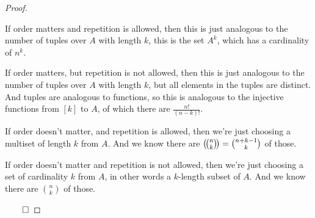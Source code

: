\begin{proof}

	\begin{msecitemize}
		\mitem If order matters and repetition is allowed, then this is just analogous to the number of tuples over $A$ with
		length $k$, this is the set $A^k$, which has a cardinality of $n^k$.

		\mitem If order matters, but repetition is not allowed, then this is just analogous to the number of tuples over $A$
		with length $k$, but all elements in the tuples are distinct.
		And tuples are analogous to functions, so this is analogous to the injective functions from $[k]$ to $A$,
		of which there are $\frac{n!}{(n-k)!}$.

		\mitem If order doesn't matter, and repetition is allowed, then we're just choosing a multiset of length $k$ from $A$.
		And we know there are $\left(\!\binom{n}{k}\!\right)=\binom{n+k-1}{k}$ of those.

		\mitem If order doesn't matter and repetition is not allowed, then we're just choosing a set of cardinality $k$ from
		$A$, in other words a $k$-length subset of $A$.
		And we know there are $\binom{n}{k}$ of those.
	\end{msecitemize}

\hfill$\qed$

\end{proof}


